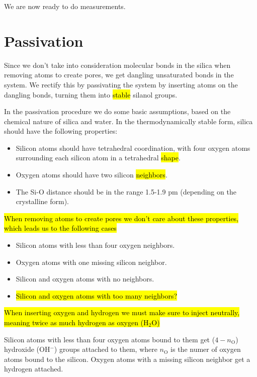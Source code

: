 We are now ready to do measurements.

\section{Passivation}
Since we don't take into consideration molecular bonds in the silica when removing atoms to create pores, we get dangling unsaturated bonds in the system. We rectify this by passivating the system by inserting atoms on the dangling bonds, turning them into \hl{stable} silanol groups.

In the passivation procedure we do some basic assumptions, based on the chemical nature of silica and water. In the thermodynamically stable form, silica should have the following properties:
\begin{itemize}
    \item Silicon atoms should have tetrahedral coordination, with four oxygen atoms surrounding each silicon atom in a tetrahedral \hl{shape}. 
    \item Oxygen atoms should have two silicon \hl{neighbors}.
    \item The Si-O distance should be in the range 1.5-1.9 pm (depending on the crystalline form).
\end{itemize}

\hl{When removing atoms to create pores we don't care about these properties, which leads us to the following cases}
\begin{itemize}
    \item Silicon atoms with less than four oxygen neighbors.
    \item Oxygen atoms with one missing silicon neighbor.
    \item Silicon and oxygen atoms with no neighbors.
    \item \hl{Silicon and oxygen atoms with too many neighbors?}
\end{itemize}

\hl{When inserting oxygen and hydrogen we must make sure to inject neutrally, meaning twice as much hydrogen as oxygen (H$_2$O)}

Silicon atoms with less than four oxygen atoms bound to them get ($4-n_\text{O}$) hydroxide (OH$^-$) groups attached to them, where $n_\text{O}$ is the numer of oxygen atoms bound to the silicon. Oxygen atoms with a missing silicon neighbor get a hydrogen attached. 

